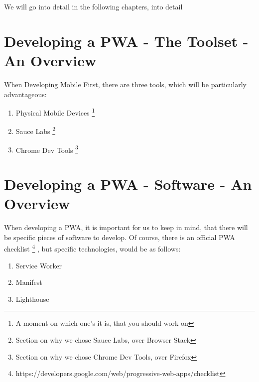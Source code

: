 We will go into detail in the following chapters, into detail
\section{ Developing a PWA - The Toolset - An Overview}
When Developing Mobile First, there are three tools, which will be particularly
advantageous:
\begin{enumerate}
  \item Physical Mobile Devices \footnote{A moment on which one's it is, that
  you should work on}
  \item Sauce Labs \footnote{Section on why we chose Sauce Labs, over Browser
  Stack}
  \item Chrome Dev Tools \footnote{Section on why we chose Chrome Dev Tools,
  over Firefox}
\end{enumerate}

\section{ Developing a PWA - Software - An Overview}
When developing a PWA, it is important for us to keep in mind, that there will
be specific pieces of software to develop. Of course, there is an official PWA
checklist \footnote{https://developers.google.com/web/progressive-web-apps/checklist}
, but specific technologies, would be as follows: 
\begin{enumerate}
  \item Service Worker
  \item Manifest
  \item Lighthouse
\end{enumerate}
